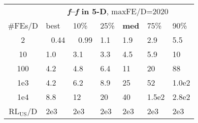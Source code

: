 \begin{tabular}{c|llllll}
 & \multicolumn{6}{|c}{\textbf{\textit{f}\raisebox{-0.35ex}{1}--\textit{f}\raisebox{-0.35ex}{24} in 5-D}, maxFE/D=2020}\\
\#FEs/D & best & 10\% & 25\% & \textbf{med} & 75\% & 90\%\\
2 & ~\,0.44 & ~\,0.99 & \hspace*{1ex}1.1 & \hspace*{1ex}1.9 & \hspace*{1ex}2.9 & \hspace*{1ex}5.5\\
10 & \hspace*{1ex}1.0 & \hspace*{1ex}3.1 & \hspace*{1ex}3.3 & \hspace*{1ex}4.5 & \hspace*{1ex}5.9 & 10\\
100 & \hspace*{1ex}4.2 & \hspace*{1ex}4.8 & \hspace*{1ex}6.4 & 11 & 20 & 88\\
1e3 & \hspace*{1ex}4.2 & \hspace*{1ex}6.2 & \hspace*{1ex}8.9 & 25 & 52 & 1.0e2\\
1e4 & \hspace*{1ex}8.8 & 12 & 20 & 40 & 1.5e2 & 2.8e2\\
$\text{RL}_{\text{US}}$/D & 2e3 & 2e3 & 2e3 & 2e3 & 2e3 & 2e3
\end{tabular}
